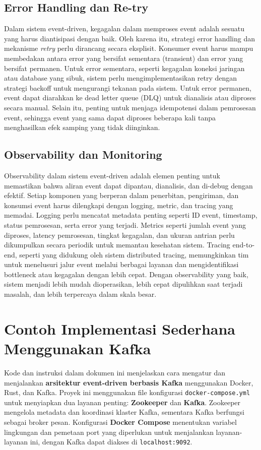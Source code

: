 \subsection{Error Handling dan Re-try}
Dalam sistem event-driven, kegagalan dalam memproses event adalah sesuatu yang harus diantisipasi dengan baik. Oleh karena itu, strategi error handling dan mekanisme \textit{retry} perlu dirancang secara eksplisit. Konsumer event harus mampu membedakan antara error yang bersifat sementara (transient) dan error yang bersifat permanen. Untuk error sementara, seperti kegagalan koneksi jaringan atau database yang sibuk, sistem perlu mengimplementasikan retry dengan strategi backoff untuk mengurangi tekanan pada sistem. Untuk error permanen, event dapat diarahkan ke dead letter queue (DLQ) untuk dianalisis atau diproses secara manual. Selain itu, penting untuk menjaga idempotensi dalam pemrosesan event, sehingga event yang sama dapat diproses beberapa kali tanpa menghasilkan efek samping yang tidak diinginkan.

\subsection{Observability dan Monitoring}
Observability dalam sistem event-driven adalah elemen penting untuk memastikan bahwa aliran event dapat dipantau, dianalisis, dan di-debug dengan efektif. Setiap komponen yang berperan dalam penerbitan, pengiriman, dan konsumsi event harus dilengkapi dengan logging, metric, dan tracing yang memadai. Logging perlu mencatat metadata penting seperti ID event, timestamp, status pemrosesan, serta error yang terjadi. Metrics seperti jumlah event yang diproses, latency pemrosesan, tingkat kegagalan, dan ukuran antrian perlu dikumpulkan secara periodik untuk memantau kesehatan sistem. Tracing end-to-end, seperti yang didukung oleh sistem distributed tracing, memungkinkan tim untuk menelusuri jalur event melalui berbagai layanan dan mengidentifikasi bottleneck atau kegagalan dengan lebih cepat. Dengan observability yang baik, sistem menjadi lebih mudah dioperasikan, lebih cepat dipulihkan saat terjadi masalah, dan lebih terpercaya dalam skala besar.



\section{Contoh Implementasi Sederhana Menggunakan Kafka}

Kode dan instruksi dalam dokumen ini menjelaskan cara mengatur dan menjalankan \textbf{arsitektur event-driven berbasis Kafka} menggunakan Docker, Rust, dan Kafka. Proyek ini menggunakan file konfigurasi \texttt{docker-compose.yml} untuk menyiapkan dua layanan penting: \textbf{Zookeeper} dan \textbf{Kafka}. Zookeeper mengelola metadata dan koordinasi klaster Kafka, sementara Kafka berfungsi sebagai broker pesan. Konfigurasi \textbf{Docker Compose} menentukan variabel lingkungan dan pemetaan port yang diperlukan untuk menjalankan layanan-layanan ini, dengan Kafka dapat diakses di \texttt{localhost:9092}.


